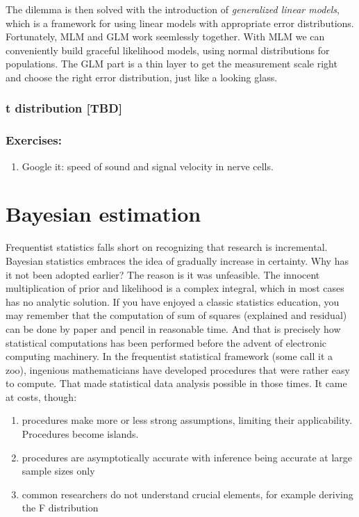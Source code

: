 \documentclass[]{svmono}
\providecommand{\tightlist}{%
  \setlength{\itemsep}{0pt}\setlength{\parskip}{0pt}}
\theoremstyle{definition}
\theoremstyle{definition}
\theoremstyle{definition}
\theoremstyle{remark}
\begin{document}
The dilemma is then solved with the introduction of \emph{generalized
linear models}, which is a framework for using linear models with
appropriate error distributions. Fortunately, MLM and GLM work
seemlessly together. With MLM we can conveniently build graceful
likelihood models, using normal distributions for populations. The GLM
part is a thin layer to get the measurement scale right and choose the
right error distribution, just like a looking glass.

\subsubsection{t distribution {[}TBD{]}}\label{t-distribution-tbd}

\subsubsection{Exercises:}\label{exercises}

\begin{enumerate}
\def\labelenumi{\arabic{enumi}.}
\tightlist
\item
  Google it: speed of sound and signal velocity in nerve cells.
\end{enumerate}

\section{Bayesian estimation}\label{bayesian-estimation}

Frequentist statistics falls short on recognizing that research is
incremental. Bayesian statistics embraces the idea of gradually increase
in certainty. Why has it not been adopted earlier? The reason is it was
unfeasible. The innocent multiplication of prior and likelihood is a
complex integral, which in most cases has no analytic solution. If you
have enjoyed a classic statistics education, you may remember that the
computation of sum of squares (explained and residual) can be done by
paper and pencil in reasonable time. And that is precisely how
statistical computations has been performed before the advent of
electronic computing machinery. In the frequentist statistical framework
(some call it a zoo), ingenious mathematicians have developed procedures
that were rather easy to compute. That made statistical data analysis
possible in those times. It came at costs, though:

\begin{enumerate}
\def\labelenumi{\arabic{enumi}.}
\tightlist
\item
  procedures make more or less strong assumptions, limiting their
  applicability. Procedures become islands.
\item
  procedures are asymptotically accurate with inference being accurate
  at large sample sizes only
\item
  common researchers do not understand crucial elements, for example
  deriving the F distribution
\end{enumerate}
\end{document}
